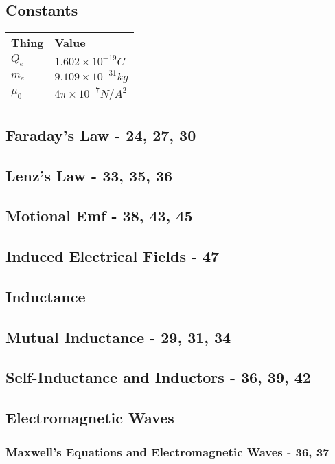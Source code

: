 \documentclass[12pt, letterpaper, twoside]{article}
\begin{document}
  \subsection*{Constants}
    \begin{tabular}{l l}
      \textbf{Thing} & \textbf{Value}\\
      $Q_e$ & $1.602 \times 10^{-19}C$\\
      $m_e$ & $9.109 \times 10^{-31}kg$\\
      $\mu_0$ & $4 \pi \times 10^{-7}N/A^ 2$
    
    \end{tabular}
  
  \subsection{Faraday's Law - 24, 27, 30}
  
  \subsection{Lenz's Law - 33, 35, 36}
  
  \subsection{Motional Emf - 38, 43, 45}
  
  \subsection{Induced Electrical Fields - 47}
  
\subsection{Inductance}
  \subsection{Mutual Inductance - 29, 31, 34}
  
  \subsection{Self-Inductance and Inductors - 36, 39, 42}
  
\subsection{Electromagnetic Waves}
  \subsubsection{Maxwell's Equations and Electromagnetic Waves - 36, 37}
  
\end{document}

